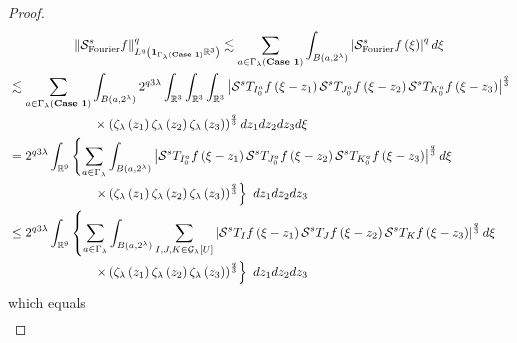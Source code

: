 \documentclass{amsart}%
\theoremstyle{plain}
\numberwithin{equation}{section}
\begin{document}
\begin{proof}
\begin{align*}
&  \ \ \ \ \ \ \ \ \ \ \ \ \ \ \ \left\Vert \mathcal{S}%
_{\operatorname*{Fourier}}^{s}f\right\Vert _{L^{q}\left(  \mathbf{1}%
_{\Gamma_{\lambda}\left(  \text{\textbf{Case 1}}\right)  }\mathbb{R}%
^{3}\right)  }^{q}\lesssim\sum_{a\in\Gamma_{\lambda}\left(  \text{\textbf{Case
1}}\right)  }\int_{B\left(  a,2^{\lambda}\right)  }\left\vert \mathcal{S}%
_{\operatorname*{Fourier}}^{s}f\left(  \xi\right)  \right\vert ^{q}d\xi\\
&  \lesssim\sum_{a\in\Gamma_{\lambda}\left(  \text{\textbf{Case 1}}\right)
}\int_{B\left(  a,2^{\lambda}\right)  }2^{q3\lambda}\int_{\mathbb{R}^{3}}%
\int_{\mathbb{R}^{3}}\int_{\mathbb{R}^{3}}\left\vert \mathcal{S}^{s}%
T_{I_{0}^{a}}f\left(  \xi-z_{1}\right)  \mathcal{S}^{s}T_{J_{0}^{a}}f\left(
\xi-z_{2}\right)  \mathcal{S}^{s}T_{K_{0}^{a}}f\left(  \xi-z_{3}\right)
\right\vert ^{\frac{q}{3}}\\
&  \ \ \ \ \ \ \ \ \ \ \ \ \ \ \ \ \ \ \ \ \times\left(  \zeta_{\lambda
}\left(  z_{1}\right)  \zeta_{\lambda}\left(  z_{2}\right)  \zeta_{\lambda
}\left(  z_{3}\right)  \right)  ^{\frac{q}{3}}dz_{1}dz_{2}dz_{3}d\xi\\
&  =2^{q3\lambda}\int_{\mathbb{R}^{9}}\left\{  \sum_{a\in\Gamma_{\lambda}}%
\int_{B\left(  a,2^{\lambda}\right)  }\left\vert \mathcal{S}^{s}T_{I_{0}^{a}%
}f\left(  \xi-z_{1}\right)  \mathcal{S}^{s}T_{J_{0}^{a}}f\left(  \xi
-z_{2}\right)  \mathcal{S}^{s}T_{K_{0}^{a}}f\left(  \xi-z_{3}\right)
\right\vert ^{\frac{q}{3}}d\xi\right. \\
&  \ \ \ \ \ \ \ \ \ \ \ \ \ \ \ \ \ \ \ \ \left.  \times\left(
\zeta_{\lambda}\left(  z_{1}\right)  \zeta_{\lambda}\left(  z_{2}\right)
\zeta_{\lambda}\left(  z_{3}\right)  \right)  ^{\frac{q}{3}}\right\}
\ dz_{1}dz_{2}dz_{3}\\
&  \leq2^{q3\lambda}\int_{\mathbb{R}^{9}}\left\{  \sum_{a\in\Gamma_{\lambda}%
}\int_{B\left(  a,2^{\lambda}\right)  }\sum_{I,J,K\in\mathcal{G}_{\lambda
}\left[  U\right]  }\left\vert \mathcal{S}^{s}T_{I}f\left(  \xi-z_{1}\right)
\mathcal{S}^{s}T_{J}f\left(  \xi-z_{2}\right)  \mathcal{S}^{s}T_{K}f\left(
\xi-z_{3}\right)  \right\vert ^{\frac{q}{3}}d\xi\right. \\
&  \ \ \ \ \ \ \ \ \ \ \ \ \ \ \ \ \ \ \ \ \left.  \times\left(
\zeta_{\lambda}\left(  z_{1}\right)  \zeta_{\lambda}\left(  z_{2}\right)
\zeta_{\lambda}\left(  z_{3}\right)  \right)  ^{\frac{q}{3}}\right\}
\ dz_{1}dz_{2}dz_{3}%
\end{align*}
which equals%
\begin{align*}

\end{align*}
\end{proof}
\end{document}
